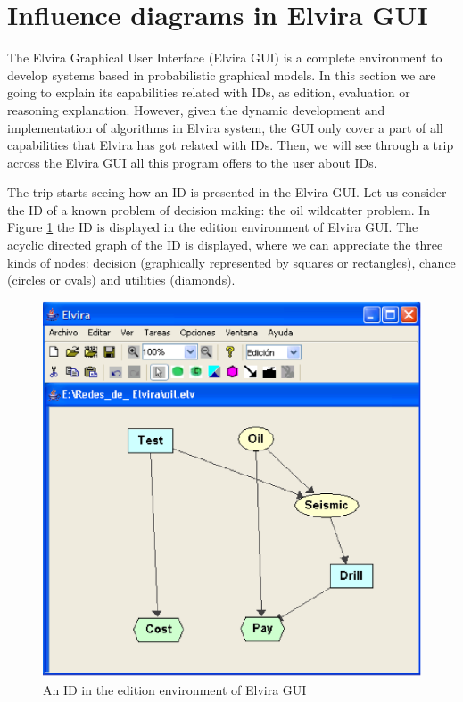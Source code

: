 


\section{Influence diagrams in Elvira GUI}

The Elvira Graphical User Interface (Elvira GUI) is a complete environment
to develop systems based in probabilistic graphical models. In this section
we are going to explain its capabilities related with IDs, as edition,
evaluation or reasoning explanation. However, given the dynamic development
and implementation of algorithms in Elvira system, the GUI only cover a part
of all capabilities that Elvira has got related with IDs. Then, we will see
through a trip across the Elvira GUI all this program offers to the user
about IDs.

The trip starts seeing how an ID is presented in the Elvira GUI. Let us
consider the ID of a known problem of decision making: the oil wildcatter
problem. In Figure \ref{fig:reactorIDGUI} the ID is displayed in the edition
environment of Elvira GUI. The acyclic directed graph of the ID is
displayed, where we can appreciate the three kinds of nodes: decision
(graphically represented by squares or rectangles), chance (circles or
ovals) and utilities (diamonds).

\begin{figure}[h]
\begin{center}
\includegraphics[scale=0.6]{./ID/fig/reactorIDGUI} \vspace{-0.5cm}
\end{center}
\caption{An ID in the edition environment of Elvira GUI}
\label{fig:reactorIDGUI}
\end{figure}

